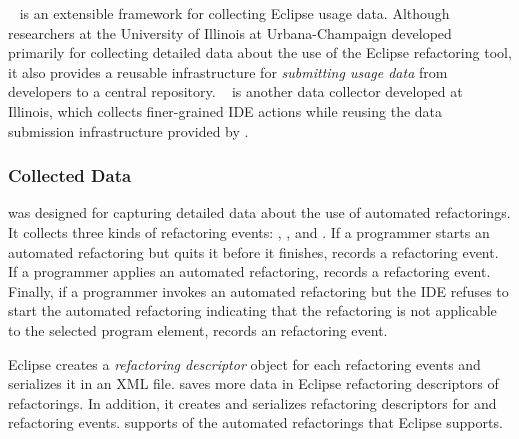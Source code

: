 \CodingSpectator~\cite{CodingSpectatorWebPage, VakilianETAL2011Richer,
  VakilianETAL2012UseDisuseMisuse, VakilianETAL2013Compositional} is
an extensible framework for collecting Eclipse usage data. Although
researchers at the University of Illinois at Urbana-Champaign
developed \CodingSpectator{} primarily for collecting detailed data
about the use of the Eclipse refactoring tool, it also provides a
reusable infrastructure for \emph{submitting usage data} from developers to
a central repository.  \CodingTracker~\cite{NegaraETAL2012Dangerous,
  NegaraETAL2013ManualRefactorings, CodingTrackerWebPage} is another
data collector developed at Illinois, which collects finer-grained IDE
actions while reusing the data submission infrastructure provided by
\CodingSpectator.

\subsubsection{Collected Data}

\CodingSpectator{} was designed for capturing detailed data about the use of
automated refactorings. It collects three kinds of refactoring events:
\Canceled, \Performed, and \Unavailable. If a programmer starts an automated
refactoring but quits it before it finishes, \CodingSpectator{} records a
\Canceled{} refactoring event. If a programmer applies an automated refactoring,
\CodingSpectator{} records a \Performed{} refactoring event. Finally, if
a programmer invokes an automated refactoring but the IDE refuses to start the
automated refactoring indicating that the refactoring is not applicable to the
selected program element, \CodingSpectator{} records an \Unavailable{}
refactoring event.

Eclipse creates a \emph{refactoring descriptor} object for each \Performed{}
refactoring events and serializes it in an XML file. \CodingSpectator{} saves
more data in Eclipse refactoring descriptors of \Performed{} refactorings. In
addition, it creates and serializes refactoring descriptors for \Canceled{} and
\Unavailable{} refactoring events. \CodingSpectator{} supports
 of the
 automated refactorings that Eclipse
supports.

